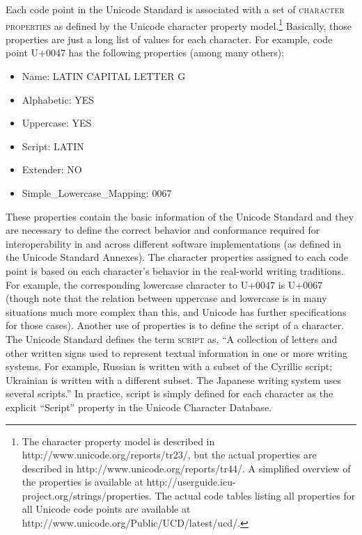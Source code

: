 Each code point in the Unicode Standard is associated with a set of \textsc{character properties} as defined by the Unicode character property model.\footnote{The character property model is described in http://www.unicode.org/reports/tr23/, but the actual properties are described in http://www.unicode.org/reports/tr44/. A simplified overview of the properties is available at http://userguide.icu-project.org/strings/properties. The actual code tables listing all properties for all Unicode code points are available at http://www.unicode.org/Public/UCD/latest/ucd/.} Basically, those properties are just a long list of values for each character. For example, code point U+0047 has the following properties (among many others):
\begin{itemize}
	\item Name: LATIN CAPITAL LETTER G 
	\item Alphabetic: YES 
	\item Uppercase: YES 
	\item Script: LATIN 
	\item Extender: NO 
	\item Simple\_Lowercase\_Mapping: 0067 
\end{itemize}

These properties contain the basic information of the Unicode Standard and they are necessary to define the correct behavior and conformance required for interoperability in and across different software implementations (as defined in the Unicode Standard Annexes). The character properties assigned to each code point is based on each character's behavior in the real-world writing traditions. For example, the corresponding lowercase character to U+0047 is U+0067 (though note that the relation between uppercase and lowercase is in many situations much more complex than this, and Unicode has further specifications for those cases). Another use of properties is to define the script of a character. The Unicode Standard defines the term \textsc{script} as, ``A collection of letters and other written signs used to represent textual information in one or more writing systems. For example, Russian is written with a subset of the Cyrillic script; Ukrainian is written with a different subset. The Japanese writing system uses several scripts.'' In practice, script is simply defined for each character as the explicit ``Script'' property in the Unicode Character Database.

